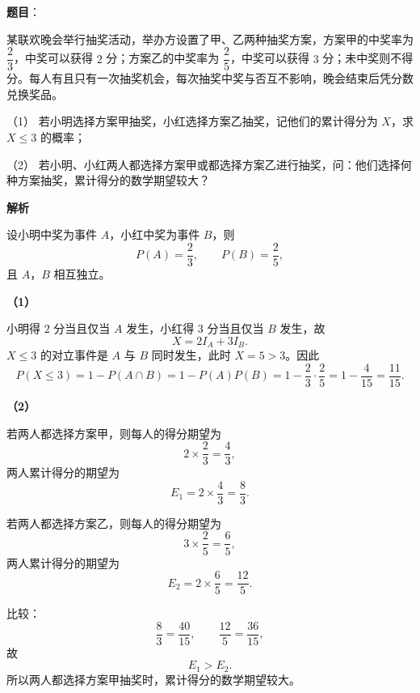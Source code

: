 \begin{answer}

\textbf{题目}：

某联欢晚会举行抽奖活动，举办方设置了甲、乙两种抽奖方案，方案甲的中奖率为 $\dfrac23$，中奖可以获得 $2$ 分；方案乙的中奖率为 $\dfrac25$，中奖可以获得 $3$ 分；未中奖则不得分。每人有且只有一次抽奖机会，每次抽奖中奖与否互不影响，晚会结束后凭分数兑换奖品。

（1） 若小明选择方案甲抽奖，小红选择方案乙抽奖，记他们的累计得分为 $X$，求 $X\leqslant3$ 的概率；

（2） 若小明、小红两人都选择方案甲或都选择方案乙进行抽奖，问：他们选择何种方案抽奖，累计得分的数学期望较大？

\textbf{解析}

设小明中奖为事件 $A$，小红中奖为事件 $B$，则
\nopagebreak[4]
\[P(A)=\frac23,\qquad P(B)=\frac25,\]
且 $A$，$B$ 相互独立。

\textbf{（1）}

小明得 $2$ 分当且仅当 $A$ 发生，小红得 $3$ 分当且仅当 $B$ 发生，故
\nopagebreak[4]
\[X=2I_A+3I_B.\]
$X\leqslant3$ 的对立事件是 $A$ 与 $B$ 同时发生，此时 $X=5>3$。因此
\nopagebreak[4]
\[P(X\leqslant3)=1-P(A\cap B)=1-P(A)P(B)
=1-\frac23\cdot\frac25=1-\frac4{15}=\frac{11}{15}.\]

\textbf{（2）}

若两人都选择方案甲，则每人的得分期望为
\nopagebreak[4]
\[2\times\frac23=\frac43,\]
两人累计得分的期望为
\nopagebreak[4]
\[E_1=2\times\frac43=\frac83.\]

若两人都选择方案乙，则每人的得分期望为
\nopagebreak[4]
\[3\times\frac25=\frac65,\]
两人累计得分的期望为
\nopagebreak[4]
\[E_2=2\times\frac65=\frac{12}{5}.\]

比较：
\nopagebreak[4]
\[\frac83=\frac{40}{15},\qquad\frac{12}{5}=\frac{36}{15},\]
故
\nopagebreak[4]
\[E_1>E_2.\]
所以两人都选择方案甲抽奖时，累计得分的数学期望较大。



\end{answer}
